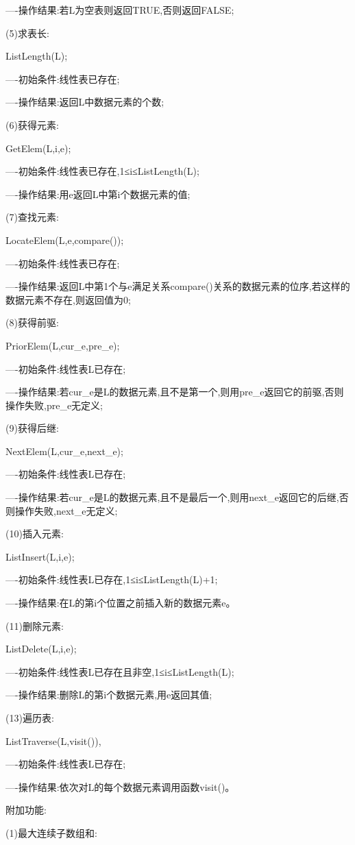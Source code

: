 \documentclass[supercite]{Experimental_Report}
\theoremstyle{definition}
\begin{document}
----操作结果:若L为空表则返回TRUE,否则返回FALSE;

(5)求表长:

ListLength(L);

----初始条件:线性表已存在;

----操作结果:返回L中数据元素的个数;

(6)获得元素:

GetElem(L,i,e);

----初始条件:线性表已存在,1≤i≤ListLength(L);

----操作结果:用e返回L中第i个数据元素的值;

(7)查找元素:

LocateElem(L,e,compare());

----初始条件:线性表已存在;

----操作结果:返回L中第1个与e满足关系compare()关系的数据元素的位序,若这样的数据元素不存在,则返回值为0;

(8)获得前驱:

PriorElem(L,cur\_e,pre\_e);

----初始条件:线性表L已存在;

----操作结果:若cur\_e是L的数据元素,且不是第一个,则用pre\_e返回它的前驱,否则操作失败,pre\_e无定义;

(9)获得后继:

NextElem(L,cur\_e,next\_e);

----初始条件:线性表L已存在;

----操作结果:若cur\_e是L的数据元素,且不是最后一个,则用next\_e返回它的后继,否则操作失败,next\_e无定义;

(10)插入元素:

ListInsert(L,i,e);

----初始条件:线性表L已存在,1≤i≤ListLength(L)+1;

----操作结果:在L的第i个位置之前插入新的数据元素e。

(11)删除元素:

ListDelete(L,i,e);

----初始条件:线性表L已存在且非空,1≤i≤ListLength(L);

----操作结果:删除L的第i个数据元素,用e返回其值;

(13)遍历表:

ListTraverse(L,visit()),

----初始条件:线性表L已存在;

----操作结果:依次对L的每个数据元素调用函数visit()。

附加功能:

(1)最大连续子数组和:
\end{document}
